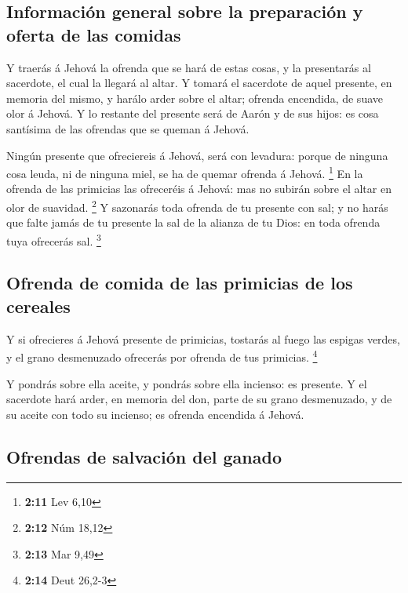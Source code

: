 \hypertarget{informaciuxf3n-general-sobre-la-preparaciuxf3n-y-oferta-de-las-comidas}{%
\subsection{Información general sobre la preparación y oferta de las
comidas}\label{informaciuxf3n-general-sobre-la-preparaciuxf3n-y-oferta-de-las-comidas}}

 Y traerás á Jehová la ofrenda que se hará de estas cosas, y
la presentarás al sacerdote, el cual la llegará al altar.  Y
tomará el sacerdote de aquel presente, en memoria del mismo, y harálo
arder sobre el altar; ofrenda encendida, de suave olor á Jehová.
 Y lo restante del presente será de Aarón y de sus hijos:
es cosa santísima de las ofrendas que se queman á Jehová.

 Ningún presente que ofreciereis á Jehová, será con
levadura: porque de ninguna cosa leuda, ni de ninguna miel, se ha de
quemar ofrenda á Jehová. \footnote{\textbf{2:11} Lev 6,10} 
En la ofrenda de las primicias las ofreceréis á Jehová: mas no subirán
sobre el altar en olor de suavidad. \footnote{\textbf{2:12} Núm 18,12}
 Y sazonarás toda ofrenda de tu presente con sal; y no
harás que falte jamás de tu presente la sal de la alianza de tu Dios: en
toda ofrenda tuya ofrecerás sal. \footnote{\textbf{2:13} Mar 9,49}

\hypertarget{ofrenda-de-comida-de-las-primicias-de-los-cereales}{%
\subsection{Ofrenda de comida de las primicias de los
cereales}\label{ofrenda-de-comida-de-las-primicias-de-los-cereales}}

 Y si ofrecieres á Jehová presente de primicias, tostarás
al fuego las espigas verdes, y el grano desmenuzado ofrecerás por
ofrenda de tus primicias. \footnote{\textbf{2:14} Deut 26,2-3}

 Y pondrás sobre ella aceite, y pondrás sobre ella
incienso: es presente.  Y el sacerdote hará arder, en
memoria del don, parte de su grano desmenuzado, y de su aceite con todo
su incienso; es ofrenda encendida á Jehová.

\hypertarget{ofrendas-de-salvaciuxf3n-del-ganado}{%
\subsection{Ofrendas de salvación del
ganado}\label{ofrendas-de-salvaciuxf3n-del-ganado}}

